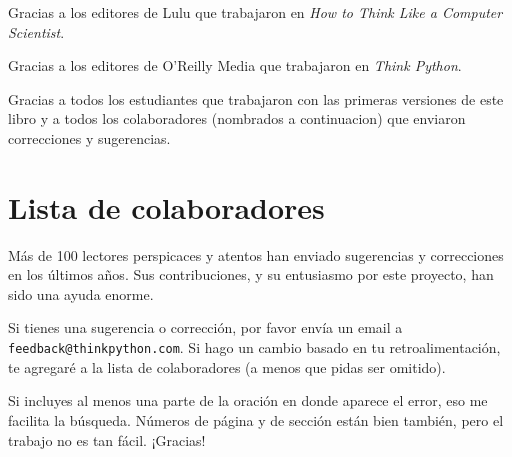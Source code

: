 \documentclass[10pt]{book}
\begin{document}
Gracias a los editores de Lulu que trabajaron en
{\em How to Think Like a Computer Scientist}.

Gracias a los editores de O'Reilly Media que trabajaron en
{\em Think Python}.

Gracias a todos los estudiantes que trabajaron con las primeras
versiones de este libro y a todos los colaboradores (nombrados
a continuacion) que enviaron correcciones y sugerencias.


\section*{Lista de colaboradores}

Más de 100 lectores perspicaces y atentos han enviado
sugerencias y correcciones en los últimos años.  Sus
contribuciones, y su entusiasmo por este proyecto, han sido una
ayuda enorme.

Si tienes una sugerencia o corrección, por favor envía un email a
{\tt feedback@thinkpython.com}.  Si hago un cambio basado en tu
retroalimentación, te agregaré a la lista de colaboradores
(a menos que pidas ser omitido).

Si incluyes al menos una parte de la oración en donde
aparece el error, eso me facilita la búsqueda.  Números de página
y de sección están bien también, pero el trabajo no es tan fácil.
¡Gracias!
\end{document}
